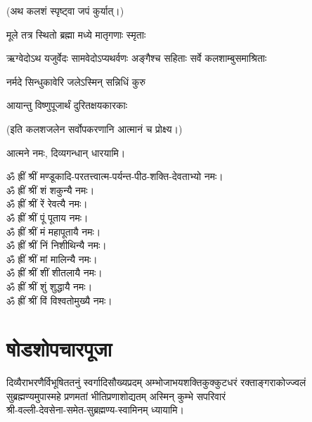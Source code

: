 (अथ कलशं स्पृष्ट्वा जपं कुर्यात्।)

{मूले तत्र स्थितो ब्रह्मा मध्ये मातृगणाः स्मृताः}

{ऋग्वेदोऽथ यजुर्वेदः सामवेदोऽप्यथर्वणः}
{अङ्गैश्च सहिताः सर्वे कलशाम्बुसमाश्रिताः}

{नर्मदे सिन्धुकावेरि जलेऽस्मिन् सन्निधिं कुरु}

{आयान्तु विष्णुपूजार्थं दुरितक्षयकारकाः}


(इति कलशजलेन सर्वोपकरणानि आत्मानं च प्रोक्ष्य।)

आत्मने नमः, दिव्यगन्धान् धारयामि। 



ॐ ह्रीं श्रीं मण्डूकादि-परतत्त्वात्म-पर्यन्त-पीठ-शक्ति-देवताभ्यो नमः।\\
ॐ ह्रीं श्रीं शं शकुन्यै नमः।\\
ॐ ह्रीं श्रीं रें रेवत्यै नमः।\\
ॐ ह्रीं श्रीं पूं पूताय नमः।\\
ॐ ह्रीं श्रीं मं महापूतायै नमः।\\
ॐ ह्रीं श्रीं निं निशीथिन्यै नमः।\\
ॐ ह्रीं श्रीं मां मालिन्यै नमः।\\
ॐ ह्रीं श्रीं शीं शीतलायै नमः।\\
ॐ ह्रीं श्रीं शुं शुद्धायै नमः।\\
ॐ ह्रीं श्रीं विं विश्वतोमुख्यै नमः।\\




\section{षोडशोपचारपूजा}

\centering

{दिव्यैराभरणैर्विभूषिततनुं स्वर्गादिसौख्यप्रदम्}
{अम्भोजाभयशक्तिकुक्कुटधरं रक्ताङ्गराकोज्ज्वलं}
{सुब्रह्मण्यमुपास्महे प्रणमतां भीतिप्रणाशोद्यतम्}
\nobreak%
अस्मिन् कुम्भे सपरिवारं\\
श्री-वल्ली-देवसेना-समेत-सुब्रह्मण्य-स्वामिनम् ध्यायामि।

